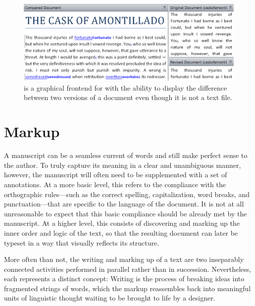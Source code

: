 \documentclass[
  a5paper,10pt,           %
  dvipsnames              %
]{book}
\begin{document}
\begin{figure}
  \includegraphics[width=\textwidth]{examples/01/tortoise-svn.png}
  \caption{ is a graphical frontend for
     with the ability to display the difference between two versions
    of a  document even though it is not a text file.}
\end{figure}


\chapter{Markup}
A manuscript can be a seamless current of words and still make perfect sense to
the author. To truly capture its meaning in a clear and unambiguous manner,
however, the manuscript will often need to be supplemented with a set of
annotations. At a more basic level, this refers to the compliance with the
orthographic rules---such as the correct spelling, capitalization, word breaks,
and punctuation---that are specific to the language of the document.  It is not
at all unreasonable to expect that this basic compliance should be already met
by the manuscript. At a higher level, this consists of discovering and marking
up the inner order and logic of the text, so that the resulting document can
later be typeset in a way that visually reflects its structure.

More often than not, the writing and marking up of a text are two inseparably
connected activities performed in parallel rather than in succession.
Nevertheless, each represents a distinct concept: Writing is the process of
breaking ideas into fragmented strings of words, which the markup reassembles
back into meaningful units of linguistic thought waiting to be brought to life
by a designer.
\end{document}

